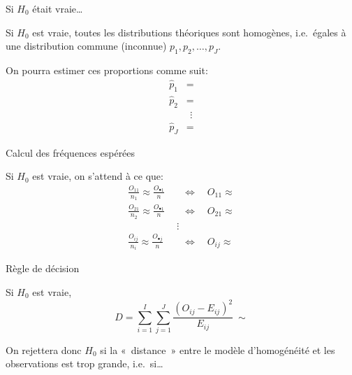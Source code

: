 \documentclass{BeamerTemplate}
\begin{document}
\begin{frame}[t]{Si $H_0$ était vraie\ldots}

Si $H_0$ est vraie, toutes les distributions théoriques sont homogènes, i.e.\
égales à une distribution commune (inconnue) $p_1,p_2,\ldots,p_J$.

\bigskip
On pourra estimer ces proportions comme suit:
\begin{align*}
\hat p_1 &= \\[2mm]
\hat p_2 &= \\
&\ \,\vdots\\
\hat p_J &=
\end{align*}

\end{frame}

\begin{frame}[t]{Calcul des fréquences espérées}

Si $H_0$ est vraie, on s'attend à ce que:
\begin{align*}
\frac{O_{11}}{n_1}\approx\frac{O_{\bullet1}}{n}
&\quad\Longleftrightarrow\quad O_{11}\approx\\[2mm]
\frac{O_{21}}{n_2}\approx\frac{O_{\bullet1}}{n}
&\quad\Longleftrightarrow\quad O_{21}\approx\\
&\ \ \vdots\\
\frac{O_{ij}}{n_i}\approx\frac{O_{\bullet j}}{n}
&\quad\Longleftrightarrow\quad O_{ij}\approx
\end{align*}

\end{frame}

\begin{frame}[t]{Règle de décision}

Si $H_0$ est vraie,
\[
D=\sum_{i=1}^{I}\sum_{j=1}^{J}\frac{(O_{ij}-E_{ij})^2}{E_{ij}}\ \sim
\]

\vspace{1.5cm}
On rejettera donc $H_0$ si la «~distance~» entre le modèle d'homogénéité et les
observations est trop grande, i.e.\ si\ldots

\end{frame}
\end{document}
